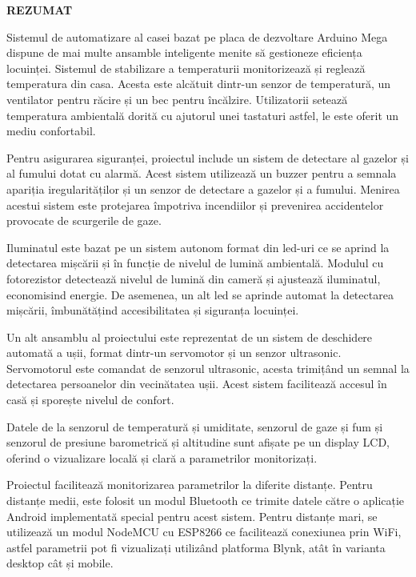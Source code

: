 \thispagestyle{abstractpagestyle}

\vspace*{36pt}

\begin{center}
\textbf{\fontsize{20pt}{24pt} \selectfont REZUMAT}
\end{center}

\vspace{24pt}

Sistemul de automatizare al casei bazat pe placa de dezvoltare Arduino Mega dispune de mai multe ansamble inteligente menite să gestioneze eficiența locuinței. Sistemul de stabilizare a temperaturii monitorizează și reglează temperatura din casa. Acesta este alcătuit dintr-un senzor de temperatură, un ventilator pentru răcire și un bec pentru încălzire. Utilizatorii setează temperatura ambientală dorită cu ajutorul unei tastaturi astfel, le este oferit un mediu confortabil.

Pentru asigurarea siguranței, proiectul include un sistem de detectare al gazelor și al fumului dotat cu alarmă. Acest sistem utilizează un buzzer pentru a semnala apariția iregularităților și un senzor de detectare a gazelor și a fumului. Menirea acestui sistem este protejarea împotriva incendiilor și prevenirea accidentelor provocate de scurgerile de gaze.

Iluminatul este bazat pe un sistem autonom format din led-uri ce se aprind la detectarea mișcării și în funcție de nivelul de lumină ambientală. Modulul cu fotorezistor detectează nivelul de lumină din cameră și ajustează iluminatul, economisind energie. De asemenea, un alt led se aprinde automat la detectarea mișcării, îmbunătățind accesibilitatea și siguranța locuinței.

Un alt ansamblu al proiectului este reprezentat de un sistem de deschidere automată a ușii, format dintr-un servomotor și un senzor ultrasonic. Servomotorul este comandat de senzorul ultrasonic, acesta trimițând un semnal la detectarea persoanelor din vecinătatea ușii. Acest sistem facilitează accesul în casă și sporește nivelul de confort.

Datele de la senzorul de temperatură și umiditate, senzorul de gaze și fum și senzorul de presiune barometrică și altitudine sunt afișate pe un display LCD, oferind o vizualizare locală și clară a parametrilor monitorizați.

Proiectul facilitează monitorizarea parametrilor la diferite distanțe. Pentru distanțe medii, este folosit un modul Bluetooth ce trimite datele către o aplicație Android implementată special pentru acest sistem. Pentru distanțe mari, se utilizează un modul NodeMCU cu ESP8266 ce facilitează conexiunea prin WiFi, astfel parametrii pot fi vizualizați utilizând platforma Blynk, atât în varianta desktop cât și mobile.

